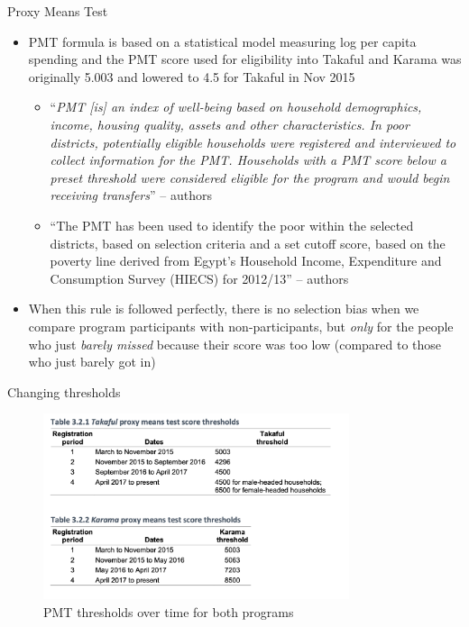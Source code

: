 \documentclass{beamer}
\begin{document}
\begin{frame}{Proxy Means Test}
\begin{itemize}
\item PMT formula is based on a statistical model measuring log per capita spending and the PMT score used for eligibility into Takaful and Karama was originally 5.003 and lowered to 4.5 for Takaful in Nov 2015
	\begin{itemize}
	\tiny
\item ``\emph{PMT [is] an index of well-being based on household demographics, income,
housing quality, assets and other characteristics. In poor districts, potentially eligible households
were registered and interviewed to collect information for the PMT. Households with a PMT score
below a preset threshold were considered eligible for the program and would begin receiving
transfers}'' -- authors
\item ``The PMT has been used to identify
the poor within the selected districts, based on selection criteria and a set cutoff score, based on the
poverty line derived from Egypt’s Household Income, Expenditure and Consumption Survey (HIECS)
for 2012/13'' -- authors
	\end{itemize}
\item When this rule is followed perfectly, there is no selection bias when we compare program participants with non-participants, but \emph{only} for the people who just \emph{barely missed} because their score was too low (compared to those who just barely got in)
\end{itemize}
\end{frame}


\begin{frame}{Changing thresholds}
    \begin{figure}
        \centering
        \includegraphics[width=0.8\textwidth]{./lecture_includes/takaful_table1.png}
        \caption{PMT thresholds over time for both programs}
    \end{figure}
\end{frame}
\end{document}
